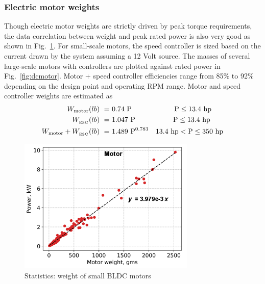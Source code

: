 \subsubsection{Electric motor weights}
Though electric motor weights are strictly driven by peak torque requirements, the data correlation between weight and peak rated power is also very good as shown in Fig.~\ref{fig:smallmotor}. For small-scale motors, the speed controller is sized based on the current drawn by the system assuming a 12 Volt source. The masses of several large-scale motors with controllers are plotted against rated power in Fig.~\ref{fig:dcmotor}. Motor + speed controller efficiencies range from 85\% to 92\% depending on the design point and operating RPM range. Motor and speed controller weights are estimated as 
\begin{align*}
W_{\rm motor} (lb) \textrm{ } = & \textrm{ } 0.74 \textrm{ P} \qquad \qquad \qquad \textrm{P} \leq 13.4 \textrm{ hp} \\
W_{_\textrm{ESC}} (lb) \textrm{ } = & \textrm{ } 1.047 \textrm{ P} \qquad \quad \qquad \textrm{      P} \leq 13.4 \textrm{ hp}\\
W_{\rm motor} + W_{_\textrm{ESC}} (lb) \textrm{ } = & \textrm{ } 1.489  \textrm{ P}^{0.783} \quad 13.4 \textrm{ hp} < \textrm{P} \leq 350 \textrm{ hp}
\end{align*}

\begin{figure}
\begin{center}
\includegraphics[width=0.75\textwidth]{images/motor.png}
\vspace{-0.1cm}
\caption{Statistics: weight of small BLDC motors}
\label{fig:smallmotor}
\end{center}
\end{figure}

